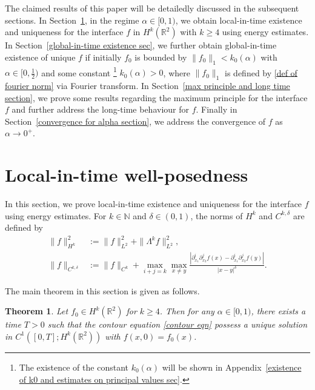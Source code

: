 \documentclass[reqno]{amsart}%
\newtheorem{thm}{Theorem}[section]
\theoremstyle{definition}
\theoremstyle{remark}
\numberwithin{equation}{section}
\newcommand{\0}{\mathbf{0}}
\newcommand{\1}{\mathbf{1}}
\newcommand{\N}{\mathbb N}
\newcommand{\R}{\mathbb R}
\numberwithin{equation}{section}
\numberwithin{theorem}{section}
\numberwithin{figure}{section}
\begin{document}
The claimed results of this paper will be detailedly discussed in the subsequent sections. In Section~\ref{local-in-time sec}, in the regime $\alpha\in[0,1)$, we obtain local-in-time existence and uniqueness for the interface $f$ in $H^k(\R^2)$ with $k\ge4$ using energy estimates. In Section~\ref{global-in-time existence sec}, we further obtain global-in-time existence of unique $f$ if initially $f_0$ is bounded by $\|f_0\|_{1}<k_0(\alpha)$ with $\alpha\in[0,\frac{1}{2})$ and some constant \footnote{The existence of the constant $k_0(\alpha)$ will be shown in Appendix~\ref{existence of k0 and estimates on principal values sec}.} $k_0(\alpha)>0$, where $\|f_0\|_{1}$ is defined by \eqref{def of fourier norm} via Fourier transform. In Section~\ref{max principle and long time section}, we prove some results regarding the maximum principle for the interface $f$ and further address the long-time behaviour for $f$. Finally in Section~\ref{convergence for alpha section}, we address the convergence of $f$ as $\alpha\to0^{+}$. 


\section{Local-in-time well-posedness}\label{local-in-time sec}

In this section, we prove local-in-time existence and uniqueness for the interface $f$ using energy estimates. For $k\in\N$ and $\delta\in(0,1)$, the norms of $H^k$ and $C^{k,\delta}$ are defined by
\begin{align*}
\|f\|^2_{H^k}&:=\|f\|^2_{L^2}+\|\Lambda^k f\|^2_{L^2},\\
\|f\|_{C^{k,\delta}}&:=\|f\|_{C^k}+\max_{i+j=k}\max_{x\neq y}\frac{|\partial_{x_1}^i\partial_{x_2}^jf(x)-\partial_{x_1}^i\partial_{x_2}^jf(y)|}{|x-y|^\delta}.
\end{align*}

The main theorem in this section is given as follows.

\begin{thm}\label{local existence thm}
Let $f_0\in H^k(\R^2)$ for $k\ge4$. Then for any $\alpha\in[0,1)$, there exists a time $T>0$ such that the contour equation \eqref{contour eqn} possess a unique solution in $C^1([0,T];H^k(\R^2))$ with $f(x,0)=f_0(x)$.
\end{thm}
\end{document}
